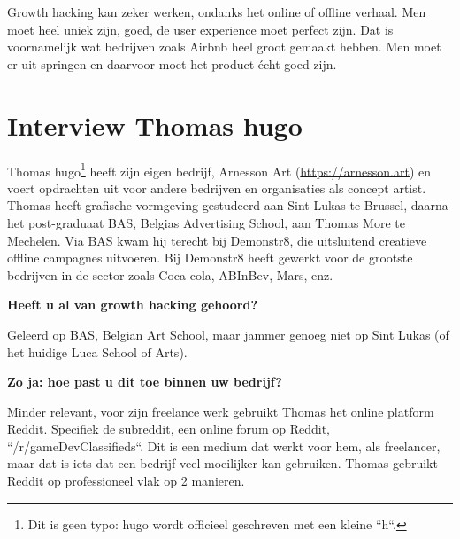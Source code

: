 Growth hacking kan zeker werken, ondanks het online of offline verhaal. Men moet heel uniek zijn, goed, de user experience moet perfect zijn. Dat is voornamelijk wat bedrijven zoals Airbnb heel groot gemaakt hebben. Men moet er uit springen en daarvoor moet het product écht goed zijn.

\section{Interview Thomas hugo}
\label{sec:interview-thomas-hugo}

Thomas hugo\footnote{Dit is geen typo: hugo wordt officieel geschreven met een kleine ``h``. } heeft zijn eigen bedrijf, Arnesson Art (\href{https://arnesson.art/}{https://arnesson.art}) en voert opdrachten uit voor andere bedrijven en organisaties als concept artist. Thomas heeft grafische vormgeving gestudeerd aan Sint Lukas te Brussel, daarna het post-graduaat BAS, Belgias Advertising School, aan Thomas More te Mechelen. Via BAS kwam hij terecht bij Demonstr8, die uitsluitend creatieve offline campagnes uitvoeren. Bij Demonstr8 heeft gewerkt voor de grootste bedrijven in de sector zoals Coca-cola, ABInBev, Mars, enz.

\textbf{Heeft u al van growth hacking gehoord?}
	
Geleerd op BAS, Belgian Art School, maar jammer genoeg niet op Sint Lukas (of het huidige Luca School of Arts). 
	
\textbf{Zo ja: hoe past u dit toe binnen uw bedrijf?}
	
Minder relevant, voor zijn freelance werk gebruikt Thomas het online platform Reddit. Specifiek de subreddit, een online forum op Reddit, ``/r/gameDevClassifieds``. Dit is een medium dat werkt voor hem, als freelancer, maar dat is iets dat een bedrijf veel moeilijker kan gebruiken. Thomas gebruikt Reddit op professioneel vlak op 2 manieren. 
	
